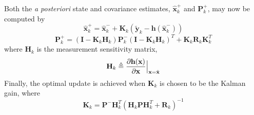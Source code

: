 \documentclass[]{aiaa-tc}%
\begin{document}
Both the \textit{a posteriori} state and covariance estimates, $\hat{\textbf{x}}_k^+$ and $\textbf{P}_k^+$, may now be computed by
%
\begin{equation} \label{eq:xhatplus}
\hat{\textbf{x}}_k^+=\hat{\textbf{x}}_k^-+\textbf{K}_k(\tilde{\textbf{y}}_k-\textbf{h}(\hat{\textbf{x}}_k^-))
\end{equation}
%
\begin{equation} \label{eq:Pplus}
\textbf{P}_k^+=(\textbf{I}-\textbf{K}_k\textbf{H}_k)\textbf{P}_k^-(\textbf{I}-\textbf{K}_k\textbf{H}_k)^T+\textbf{K}_k\textbf{R}_k\textbf{K}_k^T
\end{equation}
%
where $\textbf{H}_k$ is the measurement sensitivity matrix,
%
\begin{equation} \label{eq:Jacobian}
\textbf{H}_k\triangleq\frac{\partial{\textbf{h}(\textbf{x})}}{\partial{\textbf{x}}}\Big{|}_{\textbf{x}=\hat{\textbf{x}}}
\end{equation}
%
Finally, the optimal update is achieved when $\textbf{K}_k$ is chosen to be the Kalman gain, where
%
\begin{equation} \label{eq:K}
\textbf{K}_k=\textbf{P}^-\textbf{H}_k^T(\textbf{H}_k\textbf{P}\textbf{H}_k^T+\textbf{R}_k)^{-1}
\end{equation}
%
\end{document}
